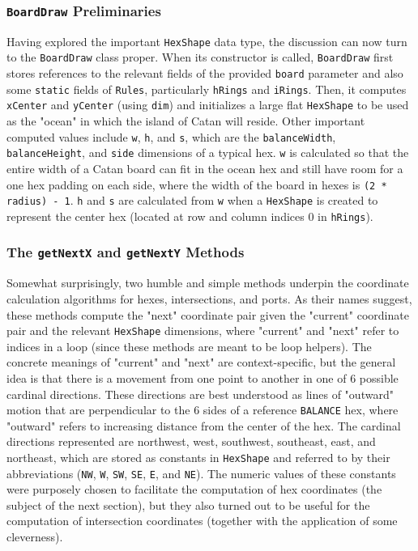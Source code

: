\documentclass[pageno]{jpaper}
\begin{document}
\begin{doublespacing}
\hypertarget{sec:boarddraw_preliminaries}{}
\subsubsection{\lstinline$BoardDraw$ Preliminaries}

Having explored the important \lstinline$HexShape$ data type, the discussion can now turn to the \lstinline$BoardDraw$ class proper. When its constructor is called, \lstinline$BoardDraw$ first stores references to the relevant fields of the provided \lstinline$board$ parameter and also some \lstinline$static$ fields of \lstinline$Rules$, particularly \lstinline$hRings$ and \lstinline$iRings$. Then, it computes \lstinline$xCenter$ and \lstinline$yCenter$ (using \lstinline$dim$) and initializes a large flat \lstinline$HexShape$ to be used as the "ocean" in which the island of Catan will reside. Other important computed values include \lstinline$w$, \lstinline$h$, and \lstinline$s$, which are the \lstinline$balanceWidth$, \lstinline$balanceHeight$, and \lstinline$side$ dimensions of a typical hex. \lstinline$w$ is calculated so that the entire width of a Catan board can fit in the ocean hex and still have room for a one hex padding on each side, where the width of the board in hexes is \lstinline$(2 * radius) - 1$. \lstinline$h$ and \lstinline$s$ are calculated from \lstinline$w$ when a \lstinline$HexShape$ is created to represent the center hex (located at row and column indices 0 in \lstinline$hRings$). 

\hypertarget{sec:the_getnextx_and_getnexty_methods}{}
\subsubsection{The \lstinline$getNextX$ and \lstinline$getNextY$ Methods}

Somewhat surprisingly, two humble and simple methods underpin the coordinate calculation algorithms for hexes, intersections, and ports. As their names suggest, these methods compute the "next" coordinate pair given the "current" coordinate pair and the relevant \lstinline$HexShape$ dimensions, where "current" and "next" refer to indices in a loop (since these methods are meant to be loop helpers). The concrete meanings of "current" and "next" are context-specific, but the general idea is that there is a movement from one point to another in one of 6 possible cardinal directions. These directions are best understood as lines of "outward" motion that are perpendicular to the 6 sides of a reference \lstinline$BALANCE$ hex, where "outward" refers to increasing distance from the center of the hex. The cardinal directions represented are northwest, west, southwest, southeast, east, and northeast, which are stored as constants in \lstinline$HexShape$ and referred to by their abbreviations (\lstinline$NW$, \lstinline$W$, \lstinline$SW$, \lstinline$SE$, \lstinline$E$, and \lstinline$NE$). The numeric values of these constants were purposely chosen to facilitate the computation of hex coordinates (the subject of the next section), but they also turned out to be useful for the computation of intersection coordinates (together with the application of some cleverness).


\end{doublespacing}
\end{document}
